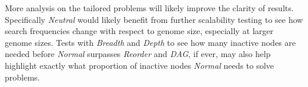 \documentclass{sig-alternate}
\begin{document}
More analysis on the tailored problems will likely improve the clarity of results.  Specifically
\emph{Neutral} would likely benefit from further scalability testing to see how search frequencies change
with respect to genome size, especially at larger genome sizes.  Tests with \emph{Breadth} and \emph{Depth} to see how many inactive
nodes are needed before \emph{Normal} surpasses \emph{Reorder} and \emph{DAG}, if ever, may
also help highlight exactly what proportion of inactive nodes \emph{Normal} needs to solve
problems.

%

%
%
\balancecolumns
\end{document}
